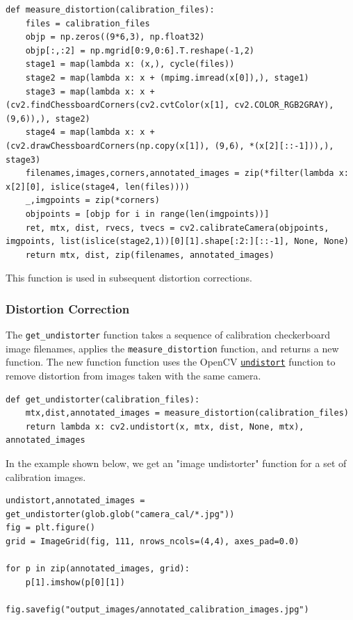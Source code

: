 \documentclass[11pt]{article}
\begin{document}
\begin{verbatim}
def measure_distortion(calibration_files):
    files = calibration_files
    objp = np.zeros((9*6,3), np.float32)
    objp[:,:2] = np.mgrid[0:9,0:6].T.reshape(-1,2)
    stage1 = map(lambda x: (x,), cycle(files))
    stage2 = map(lambda x: x + (mpimg.imread(x[0]),), stage1)
    stage3 = map(lambda x: x + (cv2.findChessboardCorners(cv2.cvtColor(x[1], cv2.COLOR_RGB2GRAY), (9,6)),), stage2)
    stage4 = map(lambda x: x + (cv2.drawChessboardCorners(np.copy(x[1]), (9,6), *(x[2][::-1])),), stage3)
    filenames,images,corners,annotated_images = zip(*filter(lambda x: x[2][0], islice(stage4, len(files))))
    _,imgpoints = zip(*corners)
    objpoints = [objp for i in range(len(imgpoints))]
    ret, mtx, dist, rvecs, tvecs = cv2.calibrateCamera(objpoints, imgpoints, list(islice(stage2,1))[0][1].shape[:2:][::-1], None, None)
    return mtx, dist, zip(filenames, annotated_images)
\end{verbatim}

This function is used in subsequent distortion corrections.

\subsubsection*{Distortion Correction}
\label{sec-2-2-2}

The \texttt{get\_undistorter} function takes a sequence of calibration
checkerboard image filenames, applies the \texttt{measure\_distortion}
function, and returns a new function.  The new function function
uses the OpenCV \href{http://docs.opencv.org/2.4/modules/imgproc/doc/geometric_transformations.html#void\%20undistort(InputArray\%20src,\%20OutputArray\%20dst,\%20InputArray\%20cameraMatrix,\%20InputArray\%20distCoeffs,\%20InputArray\%20newCameraMatrix)}{\texttt{undistort}} function to remove distortion from
images taken with the same camera.

\begin{verbatim}
def get_undistorter(calibration_files):
    mtx,dist,annotated_images = measure_distortion(calibration_files)
    return lambda x: cv2.undistort(x, mtx, dist, None, mtx), annotated_images
\end{verbatim}

In the example shown below, we get an "image undistorter"
function for a set of calibration images.

\begin{verbatim}
undistort,annotated_images = get_undistorter(glob.glob("camera_cal/*.jpg"))
fig = plt.figure()
grid = ImageGrid(fig, 111, nrows_ncols=(4,4), axes_pad=0.0)

for p in zip(annotated_images, grid):
    p[1].imshow(p[0][1])

fig.savefig("output_images/annotated_calibration_images.jpg")
\end{verbatim}
\end{document}
